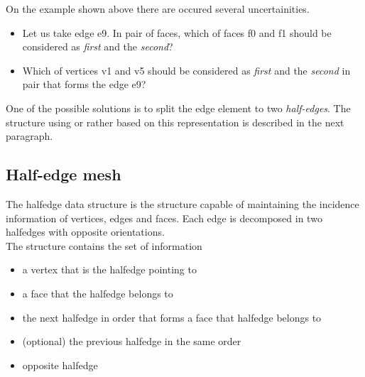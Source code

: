 On the example shown above there are occured several uncertainities.

\begin{itemize}
\item Let us take edge \textsf{e9}. In pair of faces, which of faces \textsf{f0} and 
\textsf{f1} should be considered as \emph{first} and the \emph{second}?

\item Which of vertices \textsf{v1} and \textsf{v5} should be considered as 
\emph{first} and the \emph{second} in pair that forms the edge \textsf{e9}?
\end{itemize}

One of the possible solutions is to split the edge element to two \emph{half-edges}.
The structure using or rather based on this representation is described in the next
paragraph.

\subsection{Half-edge mesh}

The halfedge data structure is the structure capable of maintaining the incidence
information of vertices, edges and faces. Each edge is decomposed in two halfedges
with opposite orientations.
\\

The structure contains the set of information
\begin{itemize}
\item a vertex that is the halfedge pointing to
\item a face that the halfedge belongs to
\item the next halfedge in order that forms a face that halfedge belongs to
\item (optional) the previous halfedge in the same order
\item opposite halfedge
\end{itemize}

